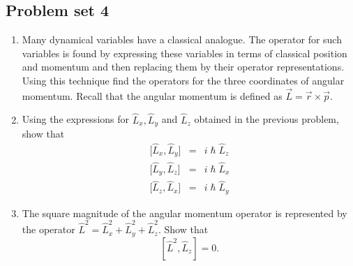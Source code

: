 \subsection{Problem set 4}
\begin{enumerate}
\item Many dynamical variables have a classical analogue. The operator for such
variables is found by expressing these variables in terms of classical position
and momentum and then replacing them by their operator representations. Using 
this technique find the operators for the three coordinates of angular momentum.
Recall that the angular momentum is defined as $\vec{L}=\vec{r}\times\vec{p}$.
\item Using the expressions for $\hat{L}_x, \hat{L}_y$ and $\hat{L}_z$ obtained
in the previous problem, show that
\begin{eqnarray}
{[}\hat{L}_x, \hat{L}_y] &=& i\hslash \hat{L}_z \label{c4s4e3} \\
{[}\hat{L}_y, \hat{L}_z] &=& i\hslash \hat{L}_x \label{c4s4e4} \\
{[}\hat{L}_z, \hat{L}_x] &=& i\hslash \hat{L}_y \label{c4s4e5}
\end{eqnarray}
\item The square magnitude of the angular momentum operator is represented by 
the operator $\hat{L}^2 = \hat{L}_x^2 + \hat{L}_y^2 + \hat{L}_z^2$. Show that
\begin{equation}\label{c4s4e6}
[\hat{L}^2, \hat{L}_z] = 0.
\end{equation}
\end{enumerate}
